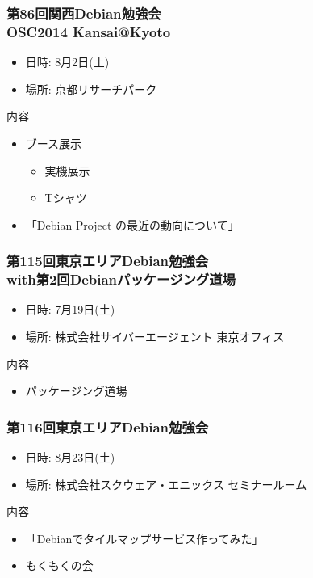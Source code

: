 \documentclass[cjk,dvipdfmx,10pt,compress,%
hyperref={bookmarks=true,bookmarksnumbered=true,bookmarksopen=false,%
colorlinks=false,%
pdftitle={第 87 回 関西 Debian 勉強会},%
pdfauthor={倉敷・のがた・佐々木・かわだ・八津尾},%
pdfsubject={資料},%
}]{beamer}
\begin{document}
\begin{frame}[fragile]
  \frametitle{第86回関西Debian勉強会\\OSC2014 Kansai@Kyoto}
  \begin{itemize}
  \item 日時: 8月2日(土)
  \item 場所: 京都リサーチパーク
  \end{itemize}
  \begin{block}{内容}
    \begin{itemize}
    \item ブース展示
      \begin{itemize}
      \item 実機展示
      \item Tシャツ
      \end{itemize}
    \item 「Debian Project の最近の動向について」
    \end{itemize}
  \end{block}
\end{frame}

\begin{frame}[fragile]
  \frametitle{第115回東京エリアDebian勉強会\\with第2回Debianパッケージング道場}
  \begin{itemize}
  \item 日時: 7月19日(土)
  \item 場所: 株式会社サイバーエージェント 東京オフィス
  \end{itemize}
  \begin{block}{内容}
    \begin{itemize}
    \item パッケージング道場
    \end{itemize}
  \end{block}
\end{frame}

\begin{frame}[fragile]
  \frametitle{第116回東京エリアDebian勉強会}
  \begin{itemize}
  \item 日時: 8月23日(土)
  \item 場所: 株式会社スクウェア・エニックス セミナールーム
  \end{itemize}
  \begin{block}{内容}
    \begin{itemize}
    \item 「Debianでタイルマップサービス作ってみた」
    \item もくもくの会
    \end{itemize}
  \end{block}
\end{frame}
\end{document}
